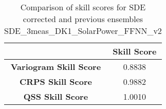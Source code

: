 
        \begin{table}[h!]
            \centering
            \begin{tabular}{|c|c|}
                \hline
                & \textbf{Skill Score}  \\
                \hline
                \textbf{Variogram Skill Score} & 0.8838  \\
                \hline
                \textbf{CRPS Skill Score} & 0.9882  \\
                \hline
                \textbf{QSS Skill Score} & 1.0010 \\
                \hline
            \end{tabular}
            \caption{Comparison of skill scores for SDE corrected and previous ensembles SDE_3meas_DK1_SolarPower_FFNN_v2}
            \label{table:skill_scores_comparison}
        \end{table}
        